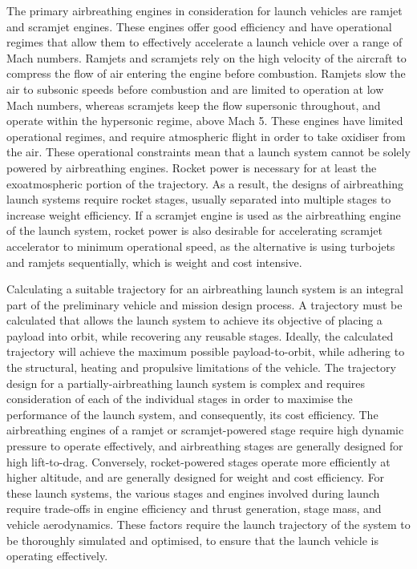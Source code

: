   	The primary airbreathing engines in consideration for launch vehicles are ramjet and scramjet engines\cite{HeiserWilliamPratt1994}. These engines offer good efficiency and have operational regimes that allow them to effectively accelerate a launch vehicle over a range of Mach numbers. 
  	Ramjets and scramjets rely on the high velocity of the aircraft to compress the flow of air entering the engine before combustion.  Ramjets slow the air to subsonic speeds before combustion and are limited to operation at low Mach numbers, whereas scramjets keep the flow supersonic throughout, and operate within the hypersonic regime, above Mach 5. 
  	These engines have limited operational regimes, and require atmospheric flight in order to take oxidiser from the air. These operational constraints mean that a launch system cannot be solely powered by airbreathing engines. Rocket power is necessary for at least the exoatmospheric portion of the trajectory. As a result, the designs of airbreathing launch systems require rocket stages, usually separated into multiple stages to increase weight efficiency\cite{Smart2009a}. If a scramjet engine is used as the airbreathing engine of the launch system, rocket power is also desirable for accelerating scramjet accelerator to minimum operational speed, as the alternative is using turbojets and ramjets sequentially\cite{Smart2009a}, which is weight and cost intensive. 
  	
  	 
  	 
  	 Calculating a suitable trajectory for an airbreathing launch system is an integral part of the preliminary vehicle and mission design process. 
  	 A trajectory must be calculated that allows the launch system to achieve its objective of placing a payload into orbit, while recovering any reusable stages.
  	 Ideally, the calculated trajectory will achieve the maximum possible payload-to-orbit, while adhering to the structural, heating and propulsive limitations of the vehicle.  
  	 The trajectory design for a partially-airbreathing launch system is complex and requires consideration of each of the individual stages in order to maximise the performance of the launch system, and consequently, its cost efficiency. 
  	   The airbreathing engines of a ramjet or scramjet-powered stage require high dynamic pressure to operate effectively, and airbreathing stages are generally designed for high lift-to-drag. Conversely, rocket-powered stages operate more efficiently at higher altitude, and are generally designed for weight and cost efficiency. For these launch systems, the various stages and engines involved during launch require trade-offs in engine efficiency and thrust generation, stage mass, and vehicle aerodynamics. These factors require the launch trajectory of the system to be thoroughly simulated and optimised, to ensure that the launch vehicle is operating effectively. 
  

